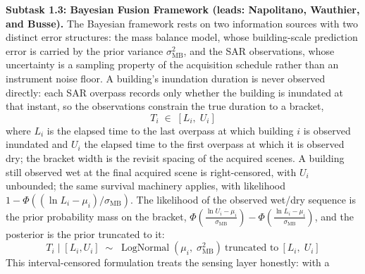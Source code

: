 \documentclass[11pt]{article}
\begin{document}

\textbf{Subtask 1.3: Bayesian Fusion Framework (leads: Napolitano, Wauthier,
and Busse).}
The Bayesian framework rests on two information sources with two distinct error
structures: the mass balance model, whose building-scale prediction error is
carried by the prior variance $\sigma_{\mathrm{MB}}^2$, and the SAR observations,
whose uncertainty is a sampling property of the acquisition schedule rather than
an instrument noise floor.
A building's inundation duration is never observed directly: each SAR overpass
records only whether the building is inundated at that instant, so the
observations constrain the true duration to a bracket,
\begin{equation}\label{eq:bracket}
  T_i \;\in\; [L_i,\; U_i]
\end{equation}
where $L_i$ is the elapsed time to the last overpass at which building $i$ is
observed inundated and $U_i$ the elapsed time to the first overpass at which it
is observed dry; the bracket width is the revisit spacing of the acquired scenes.
A building still observed wet at the final acquired scene is right-censored, with
$U_i$ unbounded; the same survival machinery applies, with likelihood
$1 - \Phi\!\left((\ln L_i - \mu_i)/\sigma_{\mathrm{MB}}\right)$.
The likelihood of the observed wet/dry sequence is the prior probability mass on
the bracket,
$\Phi\!\left(\tfrac{\ln U_i - \mu_i}{\sigma_{\mathrm{MB}}}\right) -
 \Phi\!\left(\tfrac{\ln L_i - \mu_i}{\sigma_{\mathrm{MB}}}\right)$,
and the posterior is the prior truncated to it:
\begin{equation}\label{eq:posterior}
  T_i \mid [L_i, U_i] \;\sim\;
  \operatorname{LogNormal}(\mu_i,\; \sigma_{\mathrm{MB}}^2)
  \ \text{truncated to}\ [L_i,\; U_i]
\end{equation}
This interval-censored formulation treats the sensing layer honestly: with a
\end{document}
